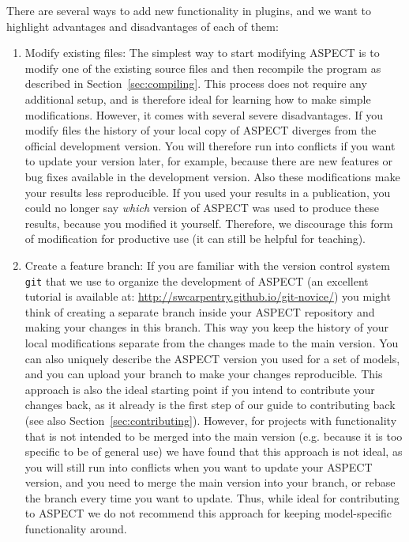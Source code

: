 \documentclass{article}
\newcommand{\aspect}{\textsc{ASPECT}}
\begin{document}
There are several ways to add new functionality in plugins, and we want to highlight advantages
and disadvantages of each of them:

\begin{enumerate}
\item Modify existing files: The simplest way to start modifying \aspect{} is
to modify one of the existing source files and then recompile the program as
described in Section~\ref{sec:compiling}. This process does not require any
additional setup, and is therefore ideal for learning how to make simple
modifications. However, it comes with several severe disadvantages. If you
modify files the history of your local copy of \aspect{} diverges from the
official development version. You will therefore run into conflicts if you want
to update your version later, for example, because there are new features or
bug fixes available in the development version. Also these modifications make
your results less reproducible. If you used your results in a publication, you
could no longer say \textit{which} version of \aspect{} was used to produce
these results, because you modified it yourself. Therefore, we discourage this
form of modification for productive use (it can still be helpful for teaching).

\item Create a feature branch: If you are familiar with the version control
system \texttt{git} that we use to organize the development of \aspect{} (an
excellent tutorial is available at:
\url{http://swcarpentry.github.io/git-novice/}) you might think of creating a
separate branch inside your \aspect{} repository and making your changes in
this branch. This way you keep the history of your local modifications separate
from the changes made to the main version. You can also uniquely describe the
\aspect{} version you used for a set of models, and you can upload your branch
to make your changes reproducible. This approach is also the ideal starting
point if you intend to contribute your changes back, as it already is the first
step of our guide to contributing back (see also
Section~\ref{sec:contributing}).  However, for projects with functionality that
is not intended to be merged into the main version (e.g. because it is too
specific to be of general use) we have found that this approach is not ideal,
as you will still run into conflicts when you want to update your \aspect{}
version, and you need to merge the main version into your branch, or rebase the
branch every time you want to update. Thus, while ideal for contributing to
\aspect{} we do not recommend this approach for keeping model-specific
functionality around.


\end{enumerate}
\end{document}

